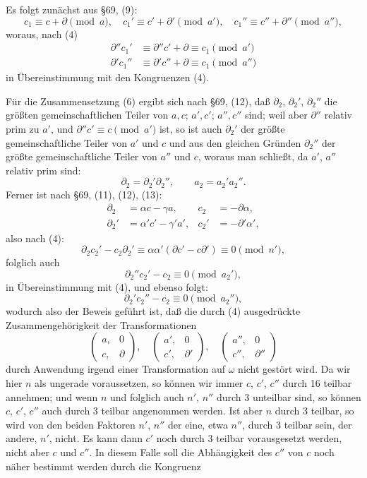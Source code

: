 Es folgt zunächst aus \S 69, (9):
\[
c_1 \equiv c+\partial \pmod{a}, \quad c_1' \equiv c'+\partial' \pmod{a'}, \quad c_1'' \equiv c''+\partial'' \pmod{a''},
\]
woraus, nach (4)
\[
\begin{aligned}
\partial''c_1' &\equiv \partial''c' + \partial \equiv c_1 \pmod{a'}\\
\partial'c_1'' &\equiv \partial'c'' + \partial \equiv c_1 \pmod{a''}
\end{aligned}
\]
in Übereinstimmung mit den Kongruenzen (4).

Für die Zusammensetzung (6) ergibt sich nach \S 69, (12), daß
$\partial_2$, $\partial_2'$, $\partial_2''$ die größten gemeinschaftlichen Teiler von $a,c$;
$a',c'$; $a'',c''$ sind; weil aber $\partial''$ relativ prim zu $a'$, und
$\partial''c' \equiv c \pmod{a'}$ ist, so ist auch $\partial_2'$ der größte gemeinschaftliche
Teiler von $a'$ und $c$ und aus den gleichen Gründen $\partial_2''$ der größte
gemeinschaftliche Teiler von $a''$ und $c$, woraus man schließt, da
$a'$, $a''$ relativ prim sind:
\[
\partial_2 = \partial_2'\partial_2'', \qquad a_2 = a_2'a_2''.
\]
Ferner ist nach \S 69, (11), (12), (13):
\[
\begin{aligned}
\partial_2 &= \alpha c - \gamma a, & c_2 &= -\partial\alpha,\\
\partial_2' &= \alpha'c' - \gamma'a', & c_2' &= -\partial'\alpha',
\end{aligned}
\]
also nach (4):
\[
\partial_2c_2' - c_2\partial_2' \equiv \alpha\alpha'(\partial c' - c\partial') \equiv 0 \pmod{n'},
\]
folglich auch
\[
\partial_2''c_2' - c_2 \equiv 0 \pmod{a_2'},
\]
in Übereinstimmung mit (4), und ebenso folgt:
\[
\partial_2'c_2'' - c_2 \equiv 0 \pmod{a_2''},
\]
wodurch also der Beweis geführt ist, daß die durch (4) ausgedrückte
Zusammengehörigkeit der Transformationen
\[
\begin{pmatrix} a, & 0\\ c, & \partial \end{pmatrix}, \quad
\begin{pmatrix} a', & 0\\ c', & \partial' \end{pmatrix}, \quad
\begin{pmatrix} a'', & 0\\ c'', & \partial'' \end{pmatrix}
\]
durch Anwendung irgend einer  Transformation auf $\omega$
nicht gestört wird. Da wir hier $n$ als ungerade voraussetzen, so
können wir immer $c$, $c'$, $c''$ durch 16 teilbar annehmen; und wenn $n$
und folglich auch $n'$, $n''$ durch 3 unteilbar sind, so können $c$, $c'$, $c''$
auch durch 3 teilbar angenommen werden. Ist aber $n$ durch 3
teilbar, so wird von den beiden Faktoren $n'$, $n''$ der eine, etwa $n''$,
durch 3 teilbar sein, der andere, $n'$, nicht. Es kann dann $c'$
noch durch 3 teilbar vorausgesetzt werden, nicht aber $c$ und $c''$.
In diesem Falle soll die Abhängigkeit des $c''$ von $c$ noch näher
bestimmt werden durch die Kongruenz
